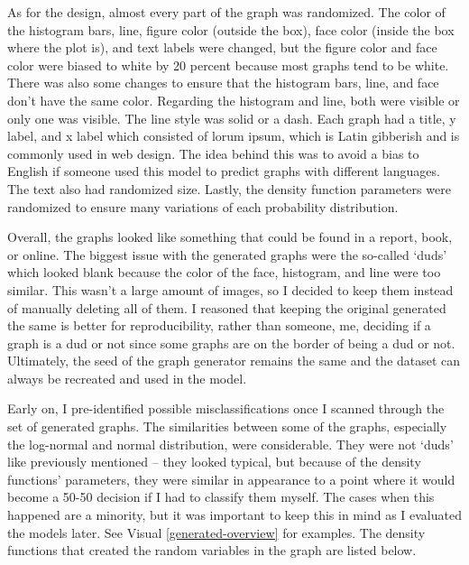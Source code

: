 \documentclass[12pt]{article}
\begin{document}
            As for the design, almost every part of the graph was randomized. 
            The color of the histogram bars, line, figure color (outside the box), face color (inside the box where the plot is), 
            and text labels were changed, but the figure color and face color were biased to white by 20 percent 
            because most graphs tend to be white. There was also some changes to ensure 
            that the histogram bars, line, and face don’t have the same color. 
            Regarding the histogram and line, both were visible or only one was visible. 
            The line style was solid or a dash. Each graph had a title, y label, and x label which consisted of lorum ipsum, 
            which is Latin gibberish and is commonly used in web design. 
            The idea behind this was to avoid a bias to English if someone used this model to predict graphs with different languages. 
            The text also had randomized size. Lastly, the density function parameters were randomized 
            to ensure many variations of each probability distribution. 
            
            Overall, the graphs looked like something that could be found in a report, book, or online. 
            The biggest issue with the generated graphs were the so-called ‘duds’ which looked blank because the color of the face, 
            histogram, and line were too similar. This wasn’t a large amount of images, 
            so I decided to keep them instead of manually deleting all of them. 
            I reasoned that keeping the original generated the same is better for reproducibility, 
            rather than someone, me, deciding if a graph is a dud or not since some graphs are on the border of being a dud or not. 
            Ultimately, the seed of the graph generator remains the same and the dataset can always be recreated and used in the model.
            
            Early on, I pre-identified possible misclassifications once I scanned through the set of generated graphs. 
            The similarities between some of the graphs, especially the log-normal and normal distribution, were considerable. 
            They were not ‘duds’ like previously mentioned -- they looked typical, but because of the density functions’ parameters, 
            they were similar in appearance to a point where it would become a 50-50 decision if I had to classify them myself. 
            The cases when this happened are a minority, but it was important to keep this in mind as I evaluated the models later.
            See Visual \ref{generated-overview} for examples. The density functions that created the random variables in the graph
            are listed below.
            
\end{document}
